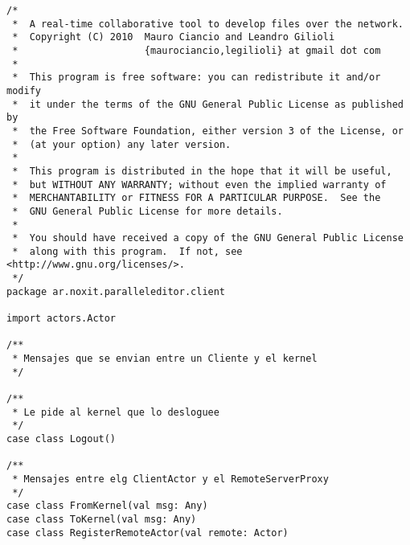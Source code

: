 {
\tiny
\begin{verbatim}
/*
 *  A real-time collaborative tool to develop files over the network.
 *  Copyright (C) 2010  Mauro Ciancio and Leandro Gilioli
 *                      {maurociancio,legilioli} at gmail dot com
 *
 *  This program is free software: you can redistribute it and/or modify
 *  it under the terms of the GNU General Public License as published by
 *  the Free Software Foundation, either version 3 of the License, or
 *  (at your option) any later version.
 *
 *  This program is distributed in the hope that it will be useful,
 *  but WITHOUT ANY WARRANTY; without even the implied warranty of
 *  MERCHANTABILITY or FITNESS FOR A PARTICULAR PURPOSE.  See the
 *  GNU General Public License for more details.
 *
 *  You should have received a copy of the GNU General Public License
 *  along with this program.  If not, see <http://www.gnu.org/licenses/>.
 */
package ar.noxit.paralleleditor.client

import actors.Actor

/**
 * Mensajes que se envian entre un Cliente y el kernel
 */

/**
 * Le pide al kernel que lo desloguee
 */
case class Logout()

/**
 * Mensajes entre elg ClientActor y el RemoteServerProxy
 */
case class FromKernel(val msg: Any)
case class ToKernel(val msg: Any)
case class RegisterRemoteActor(val remote: Actor)

\end{verbatim}
}